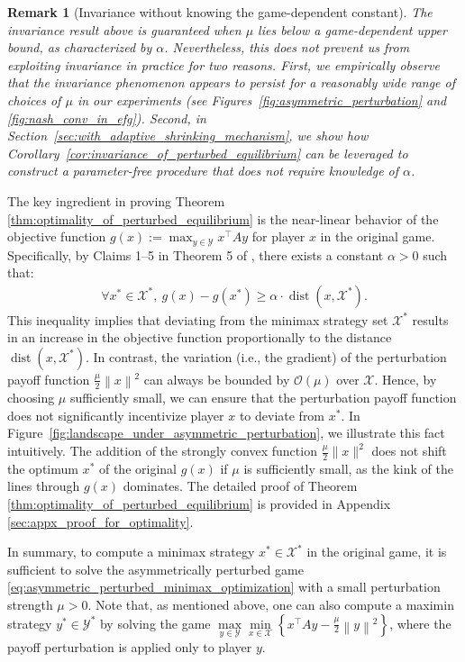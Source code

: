 \documentclass{article}
\DeclareMathOperator{\dist}{dist}
\newcommand{\X}{\mathcal{X}}
\newcommand{\Y}{\mathcal{Y}}
\theoremstyle{plain}
\newtheorem{remark}[theorem]{Remark}
\begin{document}
\begin{remark}[Invariance without knowing the game-dependent constant]
    \label{rmk:limitation}
    \normalfont
    The invariance result above is guaranteed when $\mu$ lies below a \emph{game-dependent} upper bound, as characterized by $\alpha$.
    Nevertheless, this does not prevent us from exploiting invariance in practice for two reasons.
    First, we empirically observe that the invariance phenomenon appears to persist for a reasonably wide range of choices of $\mu$ in our experiments (see Figures~\ref{fig:asymmetric_perturbation} and \ref{fig:nash_conv_in_efg}).
    Second, in Section~\ref{sec:with_adaptive_shrinking_mechanism}, we show how Corollary~\ref{cor:invariance_of_perturbed_equilibrium} can be leveraged to construct a parameter-free procedure that does not require knowledge of $\alpha$.
\end{remark}

The key ingredient in proving Theorem \ref{thm:optimality_of_perturbed_equilibrium} is the near-linear behavior of the objective function $g(x):=\max_{y\in \Y}x^{\top}Ay$ for player $x$ in the original game.
Specifically, by Claims 1--5 in Theorem 5 of \citet{wei2020linear}, there exists a constant $\alpha>0$ such that:
\begin{align}
    \forall x^{\ast}\in \X^{\ast}, ~g(x) - g\left(x^{\ast}\right) \geq \alpha \cdot \dist(x, \X^{\ast}).
    \label{eq:metric_subregularity}
\end{align}
This inequality implies that deviating from the minimax strategy set $\X^{\ast}$ results in an increase in the objective function proportionally to the distance $\dist(x, \X^{\ast})$.
In contrast, the variation (i.e., the gradient) of the perturbation payoff function $\frac{\mu}{2}\left\|x\right\|^2$ can always be bounded by $\mathcal{O}(\mu)$ over $\X$.
Hence, by choosing $\mu$ sufficiently small, we can ensure that the perturbation payoff function does not significantly incentivize player $x$ to deviate from $x^{\ast}$.
In Figure~\ref{fig:landscape_under_asymmetric_perturbation}, we illustrate this fact intuitively. The addition of the strongly convex function $\frac{\mu}{2}\|x\|^2$ does not shift the optimum $x^*$ of the original $g(x)$ if $\mu$ is sufficiently small, as the kink of the lines through $g(x)$ dominates.
The detailed proof of Theorem \ref{thm:optimality_of_perturbed_equilibrium} is provided in Appendix \ref{sec:appx_proof_for_optimality}.

In summary, to compute a minimax strategy $x^{\ast}\in \X^{\ast}$ in the original game, it is sufficient to solve the asymmetrically perturbed game \eqref{eq:asymmetric_perturbed_minimax_optimization} with a small perturbation strength $\mu > 0$.
Note that, as mentioned above, one can also compute a maximin strategy $y^{\ast}\in \Y^{\ast}$ by solving the game $\max\limits_{y\in \Y}\min\limits_{x\in \X}\left\{x^{\top}Ay - \frac{\mu}{2}\left\|y\right\|^2\right\}$, where the payoff perturbation is applied only to player $y$.
\end{document}
